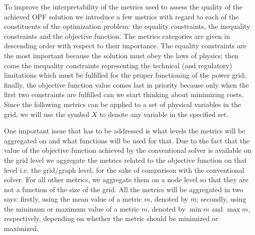 To improve the interpretability of the metrics used to assess the quality of the achieved OPF solution
we introduce a few metrics with regard to each of the constituents of the optimization problem:
the equality constraints, the inequality constraints and the objective function.
The metrics categories are given in descending order with respect to their importance.
The equality constraints are the most important because the solution must obey the laws of physics;
then come the inequality constraints representing the technical (and regulatory) limitations
which must be fulfilled for the proper functioning of the power grid;
finally, the objective function value comes last in priority because only when the
first two constraints are fulfilled can we start thinking about minimizing costs.
Since the following metrics can be applied to a set of physical variables in the grid,
we will use the symbol $X$ to denote any variable in the specified set.


One important issue that has to be addressed is what levels the metrics will be aggregated on and
what functions will be used for that.
Due to the fact that the value of the objective function achieved by the conventional solver is available
on the grid level we aggregate the metrics related to the objective function on that level i.e. the
grid/graph level, for the sake of comparison with the conventional solver.
For all other metrics, we aggregate them on a node level so that they are not a function of the size of
the grid.
All the metrics will be aggregated in two says: firstly, using the mean value of a metric $m$, denoted
by $\overline{m}$; secondly, using the minimum or maximum value of a metric $m$, denoted
by $\min m $ and $\max m $, respectively, depending on whether the metric
should be minimized or maximized.